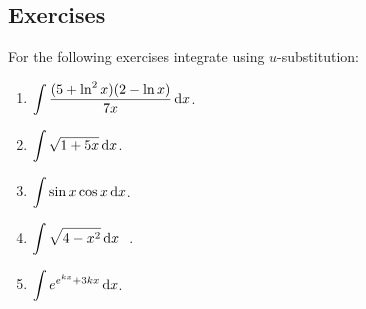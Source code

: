     \subsection*{Exercises}
    For the following exercises integrate using $u$-substitution:
    
    \begin{enumerate}
        \item $\displaystyle \int \frac{(5+\ln^2x)(2-\ln x)}{7x}\, \textrm{d}x $.
        \item $\displaystyle \int \sqrt{1+5x}\, \textrm{d}x$.
        \item $\displaystyle \int \sin x\cos x\, \textrm{d}x$.
        \item $\displaystyle \int \sqrt{4-x^2}\,\textrm{d}x\ $ .
        \item $\displaystyle \int e^{e^{kx} + 3kx}\,\textrm{d}x$.
    \end{enumerate}